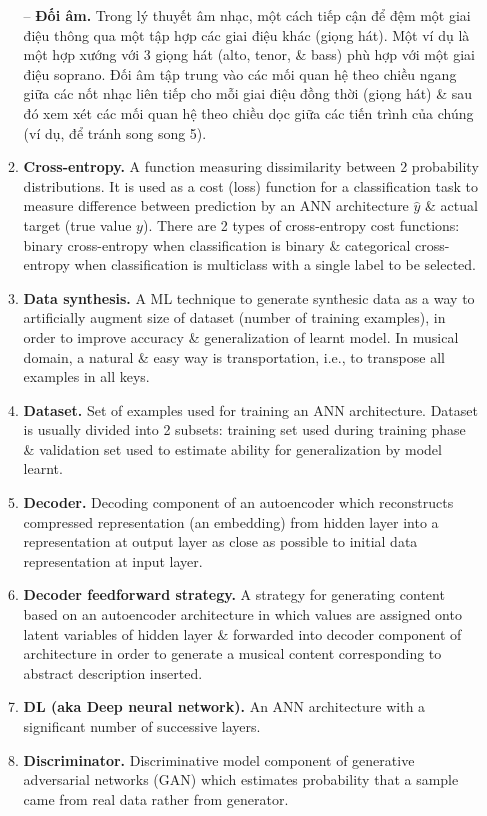 \documentclass{article}
\begin{document}
\begin{itemize}
\begin{enumerate}
		-- {\bf Đối âm.} Trong lý thuyết âm nhạc, một cách tiếp cận để đệm một giai điệu thông qua một tập hợp các giai điệu khác (giọng hát). Một ví dụ là một hợp xướng với 3 giọng hát (alto, tenor, \& bass) phù hợp với một giai điệu soprano. Đối âm tập trung vào các mối quan hệ theo chiều ngang giữa các nốt nhạc liên tiếp cho mỗi giai điệu đồng thời (giọng hát) \& sau đó xem xét các mối quan hệ theo chiều dọc giữa các tiến trình của chúng (ví dụ, để tránh song song 5).
		\item {\bf Cross-entropy.} A function measuring dissimilarity between 2 probability distributions. It is used as a cost (loss) function for a classification task to measure difference between prediction by an ANN architecture $\hat{y}$ \& actual target (true value $y$). There are 2 types of cross-entropy cost functions: binary cross-entropy when classification is binary \& categorical cross-entropy when classification is multiclass with a single label to be selected.
		\item {\bf Data synthesis.} A ML technique to generate synthesic data as a way to artificially augment size of dataset (number of training examples), in order to improve accuracy \& generalization of learnt model. In musical domain, a natural \& easy way is transportation, i.e., to transpose all examples in all keys.
		\item {\bf Dataset.} Set of examples used for training an ANN architecture. Dataset is usually divided into 2 subsets: training set used during training phase \& validation set used to estimate ability for generalization by model learnt.
		\item {\bf Decoder.} Decoding component of an autoencoder which reconstructs compressed representation (an embedding) from hidden layer into a representation at output layer as close as possible to initial data representation at input layer.
		\item {\bf Decoder feedforward strategy.} A strategy for generating content based on an autoencoder architecture in which values are assigned onto latent variables of hidden layer \& forwarded into decoder component of architecture in order to generate a musical content corresponding to abstract description inserted.
		\item {\bf DL (aka Deep neural network).} An ANN architecture with a significant number of successive layers.
		\item {\bf Discriminator.} Discriminative model component of generative adversarial networks (GAN) which estimates probability that a sample came from real data rather from generator.

\end{enumerate}
\end{itemize}
\end{document}
